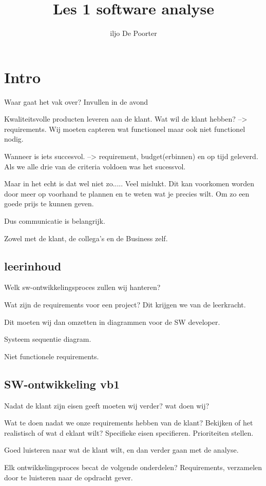 \documentclass{article}
\author{iljo De Poorter}
\title{Les 1 software analyse}
\begin{document}
\maketitle
\section{Intro}
Waar gaat het vak over? Invullen in de avond

Kwaliteitsvolle producten leveren aan de klant.
Wat wil de klant hebben? --> requirements.
Wij moeten capteren wat functioneel maar ook niet functionel nodig.

Wanneer is iets succesvol. --> requirement, budget(erbinnen) en op tijd geleverd. Als we alle drie van de criteria voldoen was het sucessvol. 

Maar in het echt is dat wel niet zo..... Veel mislukt.
Dit kan voorkomen worden door meer op voorhand te plannen en te weten wat je precies wilt. Om zo een goede prijs te kunnen geven.

Dus communicatie is belangrijk.

Zowel met de klant, de collega's en de Business zelf.

\subsection{leerinhoud}
Welk sw-ontwikkelingsproces zullen wij hanteren?

Wat zijn de requirements voor een project? Dit krijgen we van de leerkracht.

Dit moeten wij dan omzetten in diagrammen voor de SW developer.

Systeem sequentie diagram.

Niet functionele requirements.

\subsection{SW-ontwikkeling vb1}
Nadat de klant zijn eisen geeft moeten wij verder? wat doen wij?


Wat te doen nadat we onze requirements hebben van de klant?
Bekijken of het realistisch of wat d eklant wilt?
Specifieke eisen specifieren.
Prioriteiten stellen.

Goed luisteren naar wat de klant wilt, en dan verder gaan met de analyse.

Elk ontwikkelingsproces becat de volgende onderdelen?
Requirements, verzamelen door te luisteren naar de opdracht gever.
\end{document}

